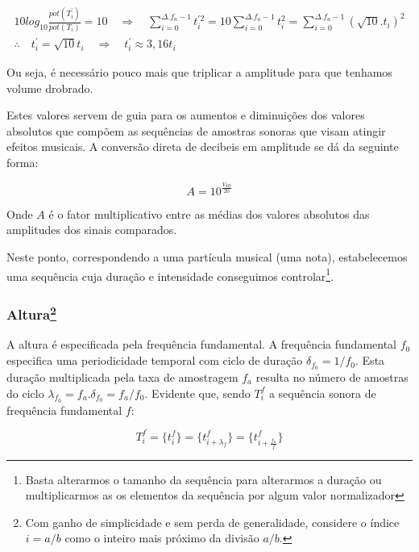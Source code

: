 \begin{gather}
10log_{10}\frac{pot(T^{'}_i)}{pot(T_i)} = 10 \quad \Rightarrow \quad \sum_{i=0}^{\Delta.f_a-1}t^{'2}_i=10\sum_{i=0}^{\Delta.f_a-1}t_i^2=\sum_{i=0}^{\Delta.f_a-1}(\sqrt{10}.t_i)^2 \\
\therefore \quad t^{'}_i=\sqrt{10}t_i \quad \Rightarrow \quad t^{'}_i \approx 3,16t_i
\end{gather}

Ou seja, é necessário pouco mais que triplicar a amplitude para que tenhamos volume drobrado.

Estes valores servem de guia para os aumentos e diminuições dos valores absolutos que compõem as
sequências de amostras sonoras que visam atingir efeitos musicais. A conversão direta de decibeis
em amplitude se dá da seguinte forma:

\begin{equation}\label{ampDec}
A = 10^{\frac{V_{dB}}{20}}
\end{equation}

Onde $A$ é o fator multiplicativo entre as médias dos valores absolutos das amplitudes dos sinais comparados.

Neste ponto, correspondendo a uma partícula musical (uma nota), estabelecemos uma sequência cuja
duração e intensidade conseguimos controlar\footnote{Basta alterarmos o tamanho da sequência para alterarmos
a duração ou multiplicarmos as os elementos da sequência por algum valor normalizador}. 

\subsubsection{Altura\footnote{Com ganho de simplicidade e sem perda de generalidade, considere o índice $i=a/b$ como o inteiro mais próximo da divisão $a/b$.}}

A altura é especificada pela frequência fundamental. A frequência fundamental $f_0$ especifica uma periodicidade temporal
com ciclo de duração $\delta_{f_0} = 1/f_0$. Esta duração multiplicada pela taxa de amostragem $f_a$ resulta no número de amostras
do ciclo $\lambda_{f_0}=f_a . \delta_{f_0} =f_a/f_0$. Evidente que, sendo $T_i^f$ a sequência sonora de frequência fundamental $f$:
    
\begin{equation}\label{periodicidade}
     T^f_i=\{ t_i^f \}=\{ t^f_{i+\lambda_{f}}  \}= \{ t^f_{i+\frac{f_a}{f}} \}
\end{equation}


